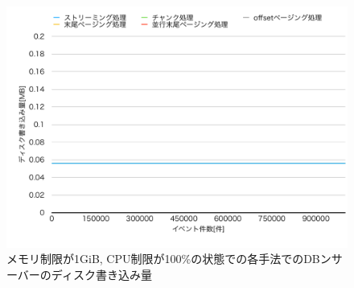 \documentclass[../../../main]{subfiles}
\begin{document}
    \begin{figure}[H]
        \centering
        \includegraphics[width=12cm]{graph}
        \caption{メモリ制限が1GiB, CPU制限が100\%の状態での各手法でのDBンサーバーのディスク書き込み量}
        \label{fig:db-disk-out}
    \end{figure}
\end{document}
